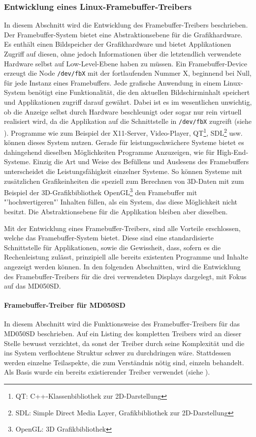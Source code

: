 \subsubsection{Entwicklung eines Linux-Framebuffer-Treibers}
In diesem Abschnitt wird die Entwicklung des Framebuffer-Treibers beschrieben. Der Framebuffer-System bietet eine Abstraktionsebene für die Grafikhardware. Es enthält einen Bildspeicher der Grafikhardware und bietet Applikationen Zugriff auf diesen, ohne jedoch Informationen über die letztendlich verwendete Hardware selbst auf Low-Level-Ebene haben zu müssen. Ein Framebuffer-Device erzeugt die Node \lstinline|/dev/fbX| mit der fortlaufenden Nummer X, beginnend bei Null, für jede Instanz eines Framebuffers. Jede grafische Anwendung in einem Linux-System benötigt eine Funktionalität, die den aktuellen Bildschirminhalt speichert und  Applikationen zugriff darauf gewährt. Dabei ist es im wesentlichen unwichtig, ob die Anzeige selbst durch Hardware beschleunigt oder sogar nur rein virtuell realisiert wird, da die Applikation auf die Schnittstelle in \lstinline|/dev/fbX| zugreift (siehe  \cite{LinuxKernelFB}).
Programme wie zum Beispiel der X11-Server, Video-Player, QT\footnote{QT: C++-Klassenbibliothek zur 2D-Darstellung}, SDL\footnote{SDL: Simple Direct Media Layer, Grafikbibliothek zur 2D-Darstellung} usw. können dieses System nutzen. Gerade für leistungsschwächere Systeme bietet es dahingehend dieselben Möglichkeiten Programme Anzuzeigen, wie für High-End-Systeme. Einzig die Art und Weise des Befüllens und Auslesens des Framebuffers unterscheidet die Leistungsfähigkeit einzelner Systeme. So können Systeme mit zusätzlichen Grafikeinheiten die speziell zum Berechnen von 3D-Daten mit zum Beispiel der 3D-Grafikbibliothek OpenGL\footnote{OpenGL: 3D Grafikbibliothek} den Framebuffer mit "'hochwertigeren"' Inhalten füllen, als ein System, das diese Möglichkeit nicht besitzt. Die Abstraktionsebene für die Applikation bleiben aber dieselben. 

Mit der Entwicklung eines Framebuffer-Treibers, sind alle Vorteile erschlossen, welche das Framebuffer-System bietet. Diese sind eine standardisierte Schnittstelle für Applikationen, sowie die Gewissheit, dass, sofern es die Rechenleistung zulässt, prinzipiell alle bereits existenten Programme und Inhalte angezeigt werden können.
In den folgenden Abschnitten, wird die Entwicklung des Framebuffer-Treibers für die drei verwendeten Displays dargelegt, mit Fokus auf das MD050SD. 
\paragraph{Framebuffer-Treiber für MD050SD}
In diesem Abschnitt wird die Funktionsweise des Framebuffer-Treibers für das MD050SD beschrieben. Auf ein Listing des kompletten Treibers wird an dieser Stelle bewusst verzichtet, da sonst der Treiber durch seine Komplexität und die ins System verflochtene Struktur schwer zu durchdringen wäre. Stattdessen werden einzelne Teilaspekte, die zum Verständnis nötig sind, einzeln behandelt. Als Basis wurde ein bereits existierender Treiber verwendet (siehe \cite{Schlegel2013c}).


